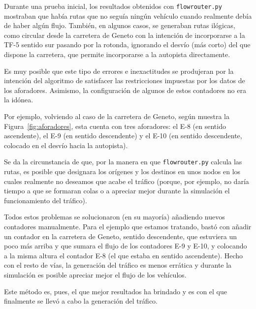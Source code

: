 Durante una prueba inicial, los resultados obtenidos con \texttt{flowrouter.py} mostraban que había rutas que no seguía ningún vehículo cuando realmente debía de haber algún flujo. También, en algunos casos, se generaban rutas ilógicas, como circular desde la carretera de Geneto con la intención de incorporarse a la TF-5 sentido sur pasando por la rotonda, ignorando el desvío (más corto) del que dispone la carretera, que permite incorporarse a la autopista directamente.

Es muy posible que este tipo de errores e inexactitudes se produjeran por la intención del algoritmo de satisfacer las restricciones impuestas por los datos de los aforadores. Asimismo, la configuración de algunos de estos contadores no era la idónea. 

Por ejemplo, volviendo al caso de la carretera de Geneto, según muestra la Figura~\ref{fig:aforadores}, esta cuenta con tres aforadores: el E-8 (en sentido ascendente), el E-9 (en sentido descendente) y el E-10 (en sentido descendente, colocado en el desvío hacia la autopista).

Se da la circunstancia de que, por la manera en que \texttt{flowrouter.py} calcula las rutas, es posible que designara los orígenes y los destinos en unos nodos en los cuales realmente no deseamos que acabe el tráfico (porque, por ejemplo, no daría tiempo a que se formaran colas o a apreciar mejor durante la simulación el funcionamiento del tráfico).

Todos estos problemas se solucionaron (en su mayoría) añadiendo nuevos contadores manualmente. Para el ejemplo que estamos tratando, bastó con añadir un contador en la carretera de Geneto, sentido descendente, que estuviera un poco más arriba y que sumara el flujo de los contadores E-9 y E-10, y colocando a la misma altura el contador E-8 (el que estaba en sentido ascendente). Hecho con el resto de vías, la generación del tráfico es menos errática y durante la simulación es posible apreciar mejor el flujo de los vehículos.

Este método es, pues, el que mejor resultados ha brindado y es con el que finalmente se llevó a cabo la generación del tráfico.